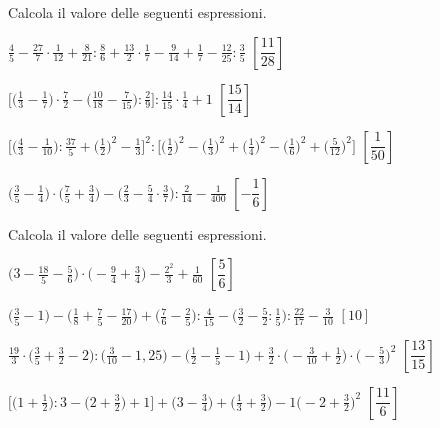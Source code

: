 \begin{esercizio}[\Ast]
\label{ese:3.146}
Calcola il valore delle seguenti espressioni.
\begin{enumeratea}
\spazielenx
\item $\displaystyle{\frac{4}{5}-\frac{27}{7}\cdot{\frac{1}{12}}+
\frac{8}{21}:\frac{8}{6}+\frac{13}{2}\cdot
\frac{1}{7}-\frac{9}{14}+\frac{1}{7}-\frac{12}{25}:\frac{3}{5}}$
  \hfill \(\left[\dfrac{11}{28} \right]\)
\item $\displaystyle{\bigg[\bigg(\frac{1}{3}-\frac{1}{7}\bigg)\cdot
{\frac{7}{2}}-\bigg(\frac{10}{18}-\frac{7}{15}\bigg):\frac{2}{9}\bigg]:
\frac{14}{15}\cdot{\frac{1}{4}}+1}$
  \hfill \(\left[\dfrac{15}{14} \right]\)
\item $\displaystyle{\bigg[\bigg(\frac{4}{3}-\frac{1}{10}\bigg):
\frac{37}{5}+\bigg(\frac{1}{2}\bigg)^{2}-\frac{1}{3}%
\bigg]^{2}:\bigg[\bigg(\frac{1}{2}\bigg)^{2}-\bigg(\frac{1}{3}\bigg)^{2}+
\bigg(\frac{1}{4}\bigg)^{2}-%
\bigg(\frac{1}{6}\bigg)^{2}+\bigg(\frac{5}{12}\bigg)^{2}\bigg]}$
  \hfill \(\left[\dfrac{1}{50} \right]\)
\item $\displaystyle{\bigg(\frac{3}{5}-\frac{1}{4}\bigg)\cdot
\bigg(\frac{7}{5}+\frac{3}{4}\bigg)-\bigg(\frac{2}{3}-%
\frac{5}{4}\cdot\frac{3}{7}\bigg):\frac{2}{14}-\frac{1}{400}}$
  \hfill \(\left[-\dfrac{1}{6} \right]\)
\end{enumeratea}
\end{esercizio}

\begin{esercizio}[\Ast]
\label{ese:3.147}
 Calcola il valore delle seguenti espressioni.
\begin{enumeratea}
\spazielenx
\item $\displaystyle{\bigg(3-\frac{18}{5}-\frac{5}{6}\bigg)\cdot%
\bigg(-{\frac{9}{4}}+\frac{3}{4}\bigg)-\frac{2^{2}}{3}+\frac{1}{60}}$
  \hfill \(\left[\dfrac{5}{6} \right]\)
\item $\displaystyle{\bigg(\frac{3}{5}-1\bigg)-\bigg(\frac{1}{8}+\frac{7}{5}-
\frac{17}{20}\bigg)+%
\bigg(\frac{7}{6}-\frac{2}{5}\bigg):\frac{4}{15}-\bigg(\frac{3}{2}-\frac{5}{2}:
\frac{1}{5}\bigg):\frac{22}{17}-%
\frac{3}{10}}$
  \hfill \(\left[10 \right]\)
\item $\displaystyle{\frac{19}{3}\cdot\bigg(\frac{3}{5}+\frac{3}{2}-2\bigg):
\bigg(\frac{3}{10}-1,25\bigg)-%
\bigg(\frac{1}{2}-\frac{1}{5}-1\bigg)+\frac{3}{2}\cdot\bigg(-{\frac{3}{10}}+
\frac{1}{2}\bigg)\cdot%
\bigg(-{\frac{5}{3}}\bigg)^{2}}$
  \hfill \(\left[\dfrac{13}{15} \right]\)
\item $\displaystyle{\bigg[\bigg(1+\frac{1}{2}\bigg):3-\bigg(2+
\frac{3}{2}\bigg)+1\bigg]+\bigg(3-\frac{3}{4}\bigg)%
+\bigg(\frac{1}{3}+\frac{3}{2}\bigg)-1\bigg(-2+\frac{3}{2}\bigg)^{2}}$
  \hfill \(\left[\dfrac{11}{6} \right]\)
\end{enumeratea}
\end{esercizio}

